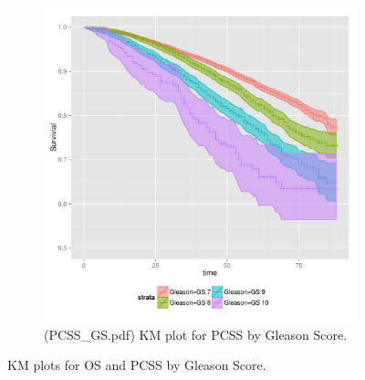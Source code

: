 \begin{figure}
\begin{subfigure}[t]{0.48\textwidth}
\begin{knitrout}
{\centering \includegraphics[width=\maxwidth]{figure/PCSS_GS} 

}



\end{knitrout}

    \caption{(PCSS\_GS.pdf) KM plot for PCSS by Gleason Score.}
    \label{fig:PCSS_GS}
  \end{subfigure}
  \caption{KM plots for OS and PCSS by Gleason Score.}
  \label{fig:OS_PCSS_GS}
\end{figure}





